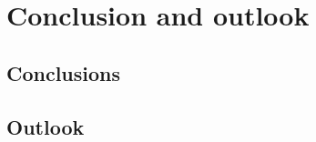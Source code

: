 \color{tudelft-cyan}
\chapter{Conclusion and outlook}
\color{black}


\label{intro}





\color{tudelft-cyan}
\section{Conclusions}
\color{black}

\color{tudelft-cyan}
\section{Outlook}
\color{black}

